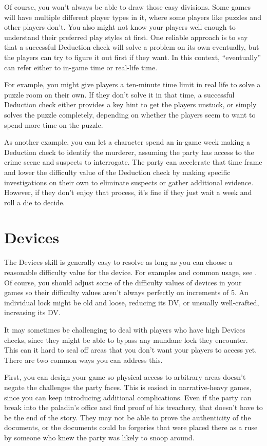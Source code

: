   Of course, you won't always be able to draw those easy divisions.
  Some games will have multiple different player types in it, where some players like puzzles and other players don't.
  You also might not know your players well enough to understand their preferred play styles at first.
  One reliable approach is to say that a successful Deduction check will solve a problem on its own eventually, but the players can try to figure it out first if they want.
  In this context, ``eventually'' can refer either to in-game time or real-life time.

  For example, you might give players a ten-minute time limit in real life to solve a puzzle room on their own.
  If they don't solve it in that time, a successful Deduction check either provides a key hint to get the players unstuck, or simply solves the puzzle completely, depending on whether the players seem to want to spend more time on the puzzle.

  As another example, you can let a character spend an in-game week making a Deduction check to identify the murderer, assuming the party has access to the crime scene and suspects to interrogate.
  The party can accelerate that time frame and lower the difficulty value of the Deduction check by making specific investigations on their own to eliminate suspects or gather additional evidence.
  However, if they don't enjoy that process, it's fine if they just wait a week and roll a die to decide.

\section{Devices}

  The Devices skill is generally easy to resolve as long as you can choose a reasonable difficulty value for the device.
  For examples and common usage, see .
  Of course, you should adjust some of the difficulty values of devices in your games so their difficulty values aren't always perfectly on increments of 5.
  An individual lock might be old and loose, reducing its DV, or unsually well-crafted, increasing its DV.

  It may sometimes be challenging to deal with players who have high Devices checks, since they might be able to bypass any mundane lock they encounter.
  This can it hard to seal off areas that you don't want your players to access yet.
  There are two common ways you can address this.

  First, you can design your game so physical access to arbitrary areas doesn't negate the challenges the party faces.
  This is easiest in narrative-heavy games, since you can keep introducing additional complications.
  Even if the party can break into the paladin's office and find proof of his treachery, that doesn't have to be the end of the story.
  They may not be able to prove the authenticity of the documents, or the documents could be forgeries that were placed there as a ruse by someone who knew the party was likely to snoop around.

